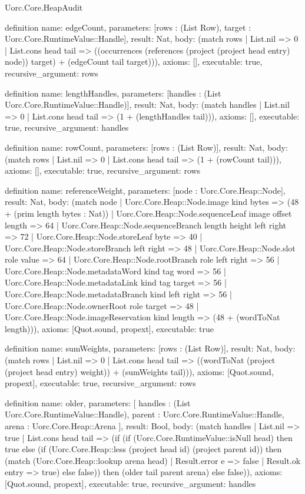 \begin{lexlean}{Uorc.Core.HeapAudit}
\begin{semanticmodule}
definition{
  name: edgeCount,
  parameters: [rows : (List Row), target : Uorc.Core.RuntimeValue::Handle],
  result: Nat,
  body: (match rows
    | List.nil => 0
    | List.cons head tail => ((occurrences (references (project (project head entry) node)) target) + (edgeCount tail target))),
  axioms: [],
  executable: true,
  recursive_argument: rows
}

definition{
  name: lengthHandles,
  parameters: [handles : (List Uorc.Core.RuntimeValue::Handle)],
  result: Nat,
  body: (match handles | List.nil => 0 | List.cons head tail => (1 + (lengthHandles tail))),
  axioms: [],
  executable: true,
  recursive_argument: handles
}

definition{
  name: rowCount,
  parameters: [rows : (List Row)],
  result: Nat,
  body: (match rows | List.nil => 0 | List.cons head tail => (1 + (rowCount tail))),
  axioms: [],
  executable: true,
  recursive_argument: rows
}

definition{
  name: referenceWeight,
  parameters: [node : Uorc.Core.Heap::Node],
  result: Nat,
  body: (match node
    | Uorc.Core.Heap::Node.image kind bytes => (48 + (prim length bytes : Nat))
    | Uorc.Core.Heap::Node.sequenceLeaf image offset length => 64
    | Uorc.Core.Heap::Node.sequenceBranch length height left right => 72
    | Uorc.Core.Heap::Node.storeLeaf byte => 40
    | Uorc.Core.Heap::Node.storeBranch left right => 48
    | Uorc.Core.Heap::Node.slot role value => 64
    | Uorc.Core.Heap::Node.rootBranch role left right => 56
    | Uorc.Core.Heap::Node.metadataWord kind tag word => 56
    | Uorc.Core.Heap::Node.metadataLink kind tag target => 56
    | Uorc.Core.Heap::Node.metadataBranch kind left right => 56
    | Uorc.Core.Heap::Node.ownerRoot role target => 48
    | Uorc.Core.Heap::Node.imageReservation kind length => (48 + (wordToNat length))),
  axioms: [Quot.sound, propext],
  executable: true
}

definition{
  name: sumWeights,
  parameters: [rows : (List Row)],
  result: Nat,
  body: (match rows
    | List.nil => 0
    | List.cons head tail => ((wordToNat (project (project head entry) weight)) + (sumWeights tail))),
  axioms: [Quot.sound, propext],
  executable: true,
  recursive_argument: rows
}

definition{
  name: older,
  parameters: [
    handles : (List Uorc.Core.RuntimeValue::Handle),
    parent : Uorc.Core.RuntimeValue::Handle,
    arena : Uorc.Core.Heap::Arena
  ],
  result: Bool,
  body: (match handles
    | List.nil => true
    | List.cons head tail => (if (if (Uorc.Core.RuntimeValue::isNull head) then true else (if (Uorc.Core.Heap::less (project head id) (project parent id)) then (match (Uorc.Core.Heap::lookup arena head)
      | Result.error e => false
      | Result.ok entry => true) else false)) then (older tail parent arena) else false)),
  axioms: [Quot.sound, propext],
  executable: true,
  recursive_argument: handles
}


\end{semanticmodule}
\end{lexlean}
